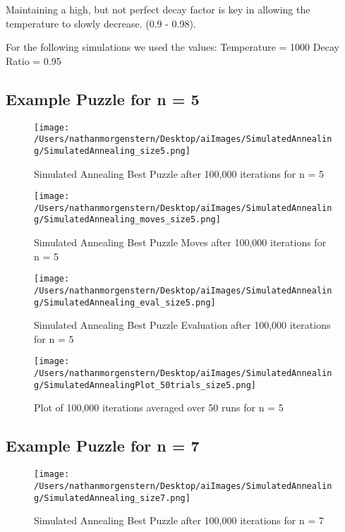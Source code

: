 \documentclass{report}
\begin{document}
Maintaining a high, but not perfect decay factor is key in allowing the temperature to slowly decrease. (0.9 - 0.98).

For the following simulations we used the values:
Temperature = 1000
Decay Ratio = 0.95

\subsection{Example Puzzle for n = 5}

	\begin{figure}[H]
	\centering
	\texttt{[image: /Users/nathanmorgenstern/Desktop/aiImages/SimulatedAnnealing/SimulatedAnnealing\_size5.png]}
	\caption{Simulated Annealing Best Puzzle after 100,000 iterations for n = 5} 
	\label{fig: Simulated Annealing Best Puzzle after 100,000 iterations for n = 5}
	\end{figure}
	
	\begin{figure}[H]
	\centering
	\texttt{[image: /Users/nathanmorgenstern/Desktop/aiImages/SimulatedAnnealing/SimulatedAnnealing\_moves\_size5.png]}
	\caption{Simulated Annealing Best Puzzle Moves after 100,000 iterations for n = 5} 
	\label{fig: Simulated Annealing Best Puzzle Moves after 100,000 iterations for n = 5}
	\end{figure}

	\begin{figure}[H]
	\centering
	\texttt{[image: /Users/nathanmorgenstern/Desktop/aiImages/SimulatedAnnealing/SimulatedAnnealing\_eval\_size5.png]}
	\caption{Simulated Annealing Best Puzzle Evaluation after 100,000 iterations for n = 5} 
	\label{fig: Simulated Annealing Best Puzzle Evaluation after 100,000 iterations for n = 5} 
	\end{figure}

	\begin{figure}[H]
	\centering
	\texttt{[image: /Users/nathanmorgenstern/Desktop/aiImages/SimulatedAnnealing/SimulatedAnnealingPlot\_50trials\_size5.png]}
	\caption{Plot of 100,000 iterations averaged over 50 runs for n = 5}
	\label{fig: Plot of 100,000 iterations averaged over 50 runs for n = 5}
	\end{figure}

\subsection{Example Puzzle for n = 7}

	\begin{figure}[H]
	\centering
	\texttt{[image: /Users/nathanmorgenstern/Desktop/aiImages/SimulatedAnnealing/SimulatedAnnealing\_size7.png]}
	\caption{Simulated Annealing Best Puzzle after 100,000 iterations for n = 7} 
	\label{fig: Simulated Annealing Best Puzzle after 100,000 iterations for n = 7}
	\end{figure}
	
\end{document}
